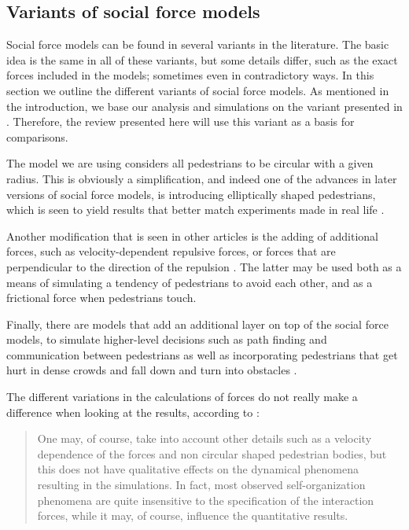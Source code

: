 \subsection{Variants of social force models}
Social force models can be found in several variants in the literature. The 
basic idea is the same in all of these variants, but some details differ, such 
as the exact forces included in the models; sometimes even in contradictory 
ways. In this section we outline the different variants of social force 
models. As mentioned in the introduction, we base our analysis and simulations 
on the variant presented in \cite{self-org}. Therefore, the review presented 
here will use this variant as a basis for comparisons.

The model we are using considers all pedestrians to be circular with a given 
radius. This is obviously a simplification, and indeed one of the advances in 
later versions of social force models, is introducing elliptically shaped 
pedestrians, which is seen to yield results that better match experiments made 
in real life \cite{ABconstant}.

Another modification that is seen in other articles is the adding of 
additional forces, such as velocity-dependent repulsive forces, or forces that 
are perpendicular to the direction of the repulsion 
\cite{helbing00,ABconstant}. The latter may be used 
both as a means of simulating a tendency of pedestrians to avoid each other, 
and as a frictional force when pedestrians touch.

Finally, there are models that add an additional layer on top of the social 
force models, to simulate higher-level decisions such as path finding and 
communication between pedestrians as well as incorporating pedestrians that 
get hurt in dense crowds and fall down and turn into obstacles \cite{HiDAC}.

The different variations in the calculations of forces do not really make a 
difference when looking at the results, according to \cite{self-org}:

\begin{quote}
    One may, of course, take into account other details such as a velocity 
    dependence of the forces and non circular shaped pedestrian bodies, but 
    this does not have qualitative effects on the dynamical phenomena 
    resulting in the simulations. In fact, most observed self-organization 
    phenomena are quite insensitive to the specification of the interaction 
    forces, while it may, of course, influence the quantitative results.
\end{quote}

